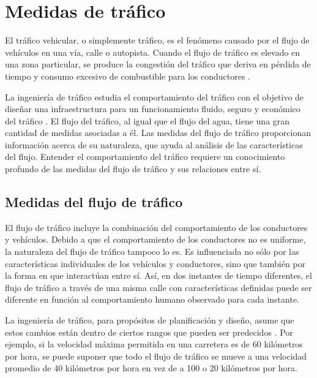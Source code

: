 \chapter{Medidas de tráfico}
\label{cap:5}

El tráfico vehicular, o simplemente tráfico, es el fenómeno causado por el flujo de vehículos en una vía, calle o autopista. Cuando el flujo de tráfico es elevado en una zona particular, se produce la congestión del tráfico que deriva en pérdida de tiempo y consumo excesivo de combustible para los conductores \citep{litman2011smart}.

La ingeniería de tráfico estudia el comportamiento del tráfico con el objetivo de diseñar una infraestructura para un funcionamiento fluido, seguro y económico del tráfico \citep{kadiyali1987traffic}. El flujo del tráfico, al igual que el flujo del agua, tiene una gran cantidad de medidas asociadas a él. Las medidas del flujo de tráfico proporcionan información acerca de su naturaleza, que ayuda al análisis de las características del flujo. Entender el comportamiento del tráfico requiere un conocimiento profundo de las medidas del flujo de tráfico y sus relaciones entre sí.

\section{Medidas del flujo de tráfico}

El flujo de tráfico incluye la combinación del comportamiento de los conductores y vehículos. Debido a que el comportamiento de los conductores no es uniforme, la naturaleza del flujo de tráfico tampoco lo es. Es influenciada no sólo por las características individuales de los vehículos y conductores, sino que también por la forma en que interactúan entre sí. Así, en dos instantes de tiempo diferentes, el flujo de tráfico a través de una misma calle con características definidas puede ser diferente en función al comportamiento humano observado para cada instante.

La ingeniería de tráfico, para propósitos de planificación y diseño, asume que estos cambios están dentro de ciertos rangos que pueden ser predecidos \citep{papacostas1987fundamentals}. Por ejemplo, si la velocidad máxima permitida en una carretera es de 60 kilómetros por hora, se puede suponer que todo el flujo de tráfico se mueve a una velocidad promedio de 40 kilómetros por hora en vez de a 100 o 20 kilómetros por hora. 

